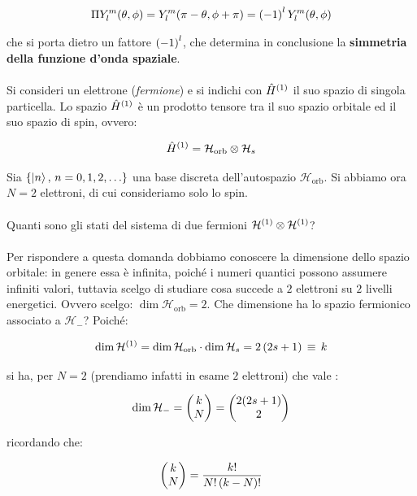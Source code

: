 \begin{align*}
	\Pi Y_l^m \qty(\theta, \phi) = Y_l^m \qty(\pi - \theta, \phi + \pi) = \qty(-1)^l \, Y_l^m\qty(\theta, \phi)
\end{align*}
	
	che si porta dietro un fattore $\qty(-1)^l$, che determina in conclusione la \textbf{simmetria della funzione d'onda spaziale}.
	\\
	\\
	Si consideri un elettrone (\textit{fermione}) e si indichi con $\hat{H}^{\qty(1)}$ il suo spazio di singola particella. Lo spazio $\hat{H}^{\qty(1)}$ è un prodotto tensore tra il suo spazio orbitale ed il suo spazio di spin, ovvero:
	
\begin{align*}
	\hat{H}^{\qty(1)} = \mathcal{H}_{\text{orb}} \otimes \mathcal{H}_s
\end{align*}

	Sia $\qty{\ket{n}, \, n = 0, 1, 2, \ldots }$ una base discreta dell'autospazio $\mathcal{H}_{\text{orb}}$. Si abbiamo ora $N = 2$ elettroni, di cui consideriamo solo lo spin. 
	\\
	\\
	Quanti sono gli stati del sistema di due fermioni $\mathcal{H}^{\qty(1)} \otimes \mathcal{H}^{\qty(1)}$?
	\\
	\\
	Per rispondere a questa domanda dobbiamo conoscere la dimensione dello spazio orbitale: in genere essa è infinita, poiché i numeri quantici possono assumere infiniti valori, tuttavia scelgo di studiare cosa succede a $2$ elettroni su $2$ livelli energetici. Ovvero scelgo: $\dim \mathcal{H}_{\text{orb}} = 2$. Che dimensione ha lo spazio fermionico associato a $\mathcal{H}_-$? Poiché:
	
\begin{align*}
	\dim \mathcal{H}^{\qty(1)} = \dim \mathcal{H}_{\text{orb}} \cdot \dim \mathcal{H}_{s} = 2 \, \qty(2 s + 1) \, \equiv \, k
\end{align*}

	si ha, per $N = 2$ (prendiamo infatti in esame $2$ elettroni) che vale :
	
\begin{align*}
	\dim \mathcal{H}_- = \mqty(k \\ N) = \mqty(2\qty(2s + 1) \\ 2) 
\end{align*}

	ricordando che:
	
\begin{align*}
	\mqty(k \\ N) = \frac{k!}{N!\, \qty(k - N)!} 
\end{align*}

